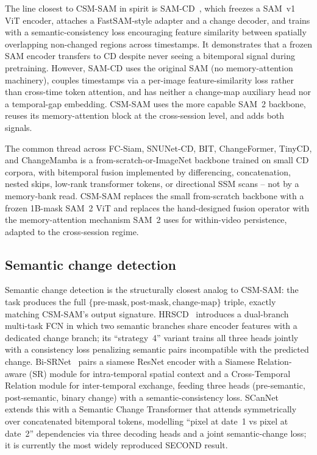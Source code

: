 The line closest to CSM-SAM in spirit is SAM-CD~\cite{ding2024samcd},
which freezes a SAM~v1 ViT encoder, attaches a FastSAM-style adapter
and a change decoder, and trains with a semantic-consistency loss
encouraging feature similarity between spatially overlapping
non-changed regions across timestamps. It demonstrates that a frozen
SAM encoder transfers to CD despite never seeing a bitemporal signal
during pretraining. However, SAM-CD uses the original SAM (no
memory-attention machinery), couples timestamps via a per-image
feature-similarity loss rather than cross-time token attention, and
has neither a change-map auxiliary head nor a temporal-gap embedding.
CSM-SAM uses the more capable SAM~2 backbone, reuses its
memory-attention block at the cross-session level, and adds both
signals.

The common thread across FC-Siam, SNUNet-CD, BIT, ChangeFormer,
TinyCD, and ChangeMamba is a from-scratch-or-ImageNet backbone
trained on small CD corpora, with bitemporal fusion implemented by
differencing, concatenation, nested skips, low-rank transformer
tokens, or directional SSM scans -- not by a memory-bank read.
CSM-SAM replaces the small from-scratch backbone with a frozen
1B-mask SAM~2 ViT and replaces the hand-designed fusion operator
with the memory-attention mechanism SAM~2 uses for within-video
persistence, adapted to the cross-session regime.

\subsection{Semantic change detection}
\label{sec:related:scd}

Semantic change detection is the structurally closest analog to
CSM-SAM: the task produces the full $\{\text{pre-mask},
\text{post-mask}, \text{change-map}\}$ triple, exactly matching
CSM-SAM's output signature. HRSCD~\cite{daudt2019hrscd} introduces a
dual-branch multi-task FCN in which two semantic branches share
encoder features with a dedicated change branch; its ``strategy~4''
variant trains all three heads jointly with a consistency loss
penalizing semantic pairs incompatible with the predicted change.
Bi-SRNet~\cite{ding2022bisrnet} pairs a siamese ResNet encoder with
a Siamese Relation-aware (SR) module for intra-temporal spatial
context and a Cross-Temporal Relation module for inter-temporal
exchange, feeding three heads (pre-semantic, post-semantic, binary
change) with a semantic-consistency loss.
SCanNet~\cite{ding2024scannet} extends this with a Semantic Change
Transformer that attends symmetrically over concatenated bitemporal
tokens, modelling ``pixel at date~1 vs pixel at date~2'' dependencies
via three decoding heads and a joint semantic-change loss; it is
currently the most widely reproduced SECOND result.

